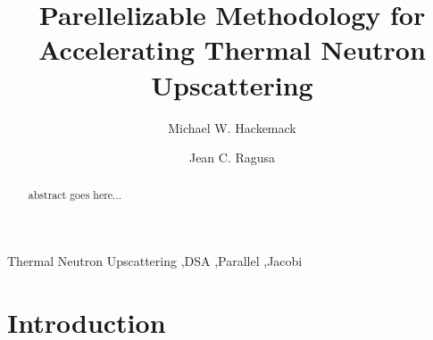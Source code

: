 \documentclass[preprint,10pt]{elsarticle}
\begin{document}
\begin{frontmatter}
\title{Parellelizable Methodology for Accelerating Thermal Neutron Upscattering}
\author{Michael W. Hackemack}
\author{Jean C. Ragusa}
\address{Department of Nuclear Engineering, Texas A\&M University, College Station, TX 77843, USA}
\begin{abstract}
abstract goes here...
\end{abstract}
\begin{keyword}
Thermal Neutron Upscattering \sep DSA \sep Parallel \sep Jacobi
\end{keyword}
\end{frontmatter}

\linenumbers

\section{Introduction} \label{sec::intro}
\end{document}
